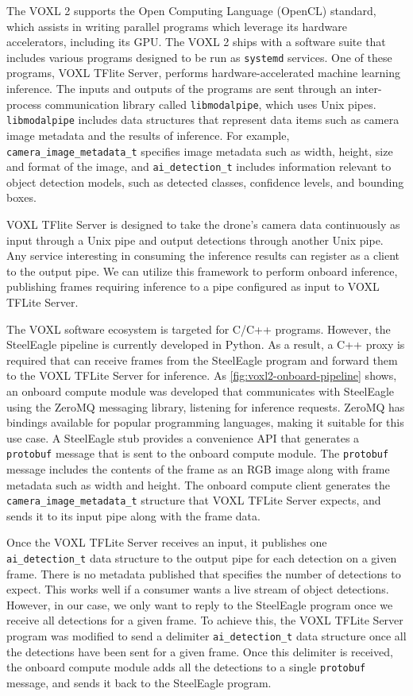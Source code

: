 The VOXL 2 supports the Open Computing Language (OpenCL) standard, which
assists in writing parallel programs which leverage its hardware accelerators,
including its GPU. The VOXL 2 ships with a software suite that includes various
programs designed to be run as \texttt{systemd} services. One of these
programs, VOXL TFlite Server, performs hardware-accelerated machine learning
inference. The inputs and outputs of the programs are sent through an
inter-process communication library called \texttt{libmodalpipe}, which uses
Unix pipes. \texttt{libmodalpipe} includes data structures that represent data
items such as camera image metadata and the results of inference. For example,
\texttt{camera\_image\_metadata\_t} specifies image metadata such as width,
height, size and format of the image, and \texttt{ai\_detection\_t} includes
information relevant to object detection models, such as detected classes,
confidence levels, and bounding boxes.

VOXL TFlite Server is designed to take the drone's camera data continuously as
input through a Unix pipe and output detections through another Unix pipe. Any
service interesting in consuming the inference results can register as a client
to the output pipe. We can utilize this framework to perform onboard inference,
publishing frames requiring inference to a pipe configured as input to VOXL
TFLite Server.

The VOXL software ecosystem is targeted for C/C++ programs. However, the
SteelEagle pipeline is currently developed in Python. As a result, a C++ proxy
is required that can receive frames from the SteelEagle program and forward
them to the VOXL TFLite Server for inference.  As
\cref{fig:voxl2-onboard-pipeline} shows, an onboard compute module was
developed that communicates with SteelEagle using the ZeroMQ messaging library,
listening for inference requests. ZeroMQ has bindings available for popular
programming languages, making it suitable for this use case. A SteelEagle stub
provides a convenience API that generates a \texttt{protobuf} message that is
sent to the onboard compute module. The \texttt{protobuf} message includes the
contents of the frame as an RGB image along with frame metadata such as width
and height. The onboard compute client generates the
\texttt{camera\_image\_metadata\_t} structure that VOXL TFLite Server expects,
and sends it to its input pipe along with the frame data.

Once the VOXL TFLite Server receives an input, it publishes one
\texttt{ai\_detection\_t} data structure to the output pipe for each detection
on a given frame. There is no metadata published that specifies the number of
detections to expect. This works well if a consumer wants a live stream of
object detections. However, in our case, we only want to reply to the
SteelEagle program once we receive all detections for a given frame. To achieve
this, the VOXL TFLite Server program was modified to send a delimiter
\texttt{ai\_detection\_t} data structure once all the detections have been sent
for a given frame. Once this delimiter is received, the onboard compute module
adds all the detections to a single \texttt{protobuf} message, and sends it
back to the SteelEagle program.

